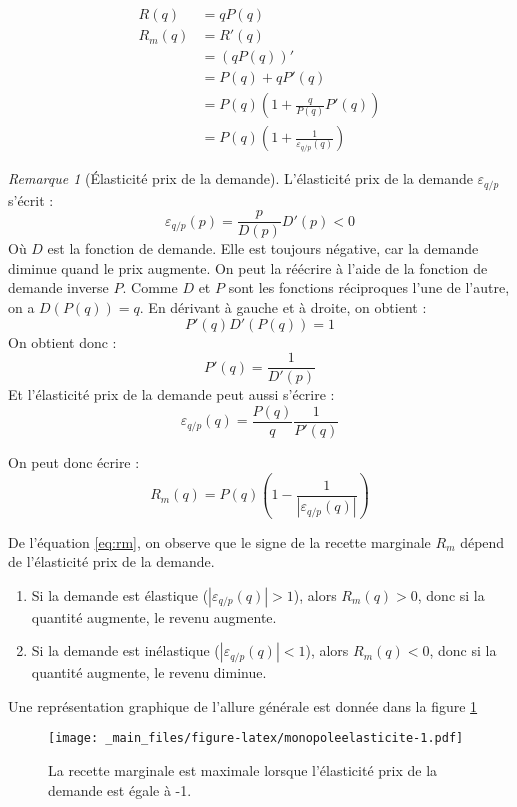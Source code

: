 \documentclass[
]{book}
\providecommand{\tightlist}{%
  \setlength{\itemsep}{0pt}\setlength{\parskip}{0pt}}
\theoremstyle{definition}
\theoremstyle{definition}
\theoremstyle{definition}
\theoremstyle{definition}
\theoremstyle{remark}
\newtheorem*{remark}{Remarque}
\begin{document}
\begin{align*}
R(q) & = qP(q)\\
R_m(q)& = R'(q) \\
& = \left(qP(q)\right)' \\
& = P(q) + qP'(q) \\
& = P(q)\left(1 + \frac{q}{P(q)}P'(q) \right)\\
& = P(q)\left(1 + \frac{1}{\varepsilon_{q/p}(q)}\right)
\end{align*}

\begin{remark}[Élasticité prix de la demande]
L'élasticité prix de la demande \(\varepsilon_{q/p}\) s'écrit :
\[\varepsilon_{q/p}(p)=\frac{p}{D(p)}D'(p) <0\]
Où \(D\) est la fonction de demande.
Elle est toujours négative, car la demande diminue quand le prix augmente.
On peut la réécrire à l'aide de la fonction de demande inverse \(P\).
Comme \(D\) et \(P\) sont les fonctions réciproques l'une de l'autre, on a \(D(P(q)) = q\).
En dérivant à gauche et à droite, on obtient :
\[P'(q)D'(P(q)) = 1\]
On obtient donc :
\[P'(q)=\frac{1}{D'(p)}\]
Et l'élasticité prix de la demande peut aussi s'écrire :
\[\varepsilon_{q/p}(q)=\frac{P(q)}{q}\frac{1}{P'(q)}\]
\end{remark}

On peut donc écrire :
\begin{equation}
R_m(q) = P(q)\left(1 - \frac{1}{|\varepsilon_{q/p}(q)|}\right)
\label{eq:rm}
\end{equation}

De l'équation \eqref{eq:rm}, on observe que le signe de la recette marginale \(R_m\) dépend de l'élasticité prix de la demande.

\begin{enumerate}
\def\labelenumi{\arabic{enumi}.}
\tightlist
\item
  Si la demande est élastique (\(|\varepsilon_{q/p}(q)|>1\)), alors \(R_m(q)>0\), donc si la quantité augmente, le revenu augmente.
\item
  Si la demande est inélastique (\(|\varepsilon_{q/p}(q)|<1\)), alors \(R_m(q)<0\), donc si la quantité augmente, le revenu diminue.
\end{enumerate}

Une représentation graphique de l'allure générale est donnée dans la figure \ref{fig:monopoleelasticite}

\begin{figure}
\centering
\texttt{[image: \_main\_files/figure-latex/monopoleelasticite-1.pdf]}
\caption{\label{fig:monopoleelasticite}La recette marginale est maximale lorsque l'élasticité prix de la demande est égale à -1.}
\end{figure}
\end{document}
